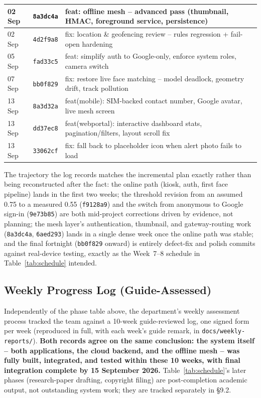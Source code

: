 \documentclass[12pt,a4paper,oneside]{report}
\begin{document}
\begin{longtable}{|p{1.7cm}|p{1.5cm}|p{9.5cm}|}
02 Sep & \texttt{8a3dc4a} & feat: offline mesh -- advanced pass (thumbnail, HMAC, foreground service, persistence) \\ \hline
02 Sep & \texttt{4d2f9a8} & fix: location \& geofencing review -- rules regression + fail-open hardening \\ \hline
05 Sep & \texttt{fad33c5} & feat: simplify auth to Google-only, enforce system roles, camera switch \\ \hline
07 Sep & \texttt{bb0f829} & fix: restore live face matching -- model deadlock, geometry drift, track pollution \\ \hline
13 Sep & \texttt{8a3d32a} & feat(mobile): SIM-backed contact number, Google avatar, live mesh screen \\ \hline
13 Sep & \texttt{dd37ec8} & feat(webportal): interactive dashboard stats, pagination/filters, layout scroll fix \\ \hline
13 Sep & \texttt{33062cf} & fix: fall back to placeholder icon when alert photo fails to load \\
\hline
\end{longtable}

The trajectory the log records matches the incremental plan exactly rather
than being reconstructed after the fact: the online path (kiosk, auth,
first face pipeline) lands in the first two weeks; the threshold revision
from an assumed 0.75 to a measured 0.55 (\texttt{f9128a9}) and the switch
from anonymous to Google sign-in (\texttt{9e73b85}) are both mid-project
corrections driven by evidence, not planning; the
mesh layer's authentication, thumbnail, and gateway-routing work
(\texttt{8a3dc4a}, \texttt{6aed293}) lands in a single dense week once the
online path was stable; and the final fortnight (\texttt{bb0f829} onward)
is entirely defect-fix and polish commits against real-device testing,
exactly as the Week~7--8 schedule in Table~\ref{tab:schedule} intended.

\subsection{Weekly Progress Log (Guide-Assessed)}
\label{sec:weekly-log}

Independently of the phase table above, the department's weekly assessment
process tracked the team against a 10-week guide-reviewed log, one signed
form per week (reproduced in full, with each week's guide remark, in
\texttt{docs/weekly-reports/}). \textbf{Both records agree on the same
conclusion: the system
itself -- both applications, the cloud backend, and the offline mesh --
was fully built, integrated, and tested within these 10 weeks, with final
integration complete by 15 September 2026.} Table~\ref{tab:schedule}'s
later phases (research-paper drafting, copyright filing) are
post-completion academic output, not outstanding system work; they are
tracked separately in \S9.2.
\end{document}
